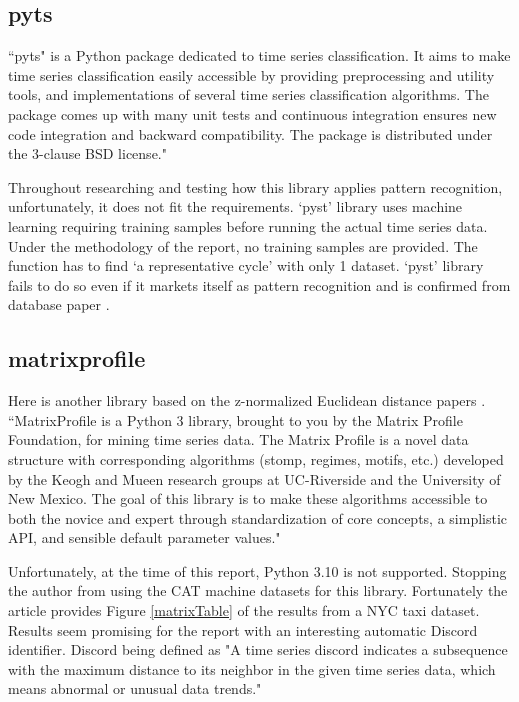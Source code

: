 \subsection{pyts}
``pyts" is a Python package dedicated to time series classification. It aims to make time series classification easily accessible by providing preprocessing and utility tools, and implementations of several time series classification algorithms. The package comes up with many unit tests and continuous integration ensures new code integration and backward compatibility. The package is distributed under the 3-clause BSD license." \cite{JMLR:v21:19-763}

Throughout researching and testing how this library applies pattern recognition, unfortunately, it does not fit the requirements. `pyst' library uses machine learning requiring training samples before running the actual time series data. Under the methodology of the report, no training samples are provided. The function has to find `a representative cycle' with only 1 dataset. `pyst' library fails to do so even if it markets itself as pattern recognition and is confirmed from database paper \cite{DBLP:journals/corr/abs-2104-07406}.

\subsection{matrixprofile}

Here is another library based on the z-normalized Euclidean distance papers \cite{zhu_imamura_nikovski_keogh_2017}. 
``MatrixProfile is a Python 3 library, brought to you by the Matrix Profile Foundation, for mining time series data. The Matrix Profile is a novel data structure with corresponding algorithms (stomp, regimes, motifs, etc.) developed by the Keogh and Mueen research groups at UC-Riverside and the University of New Mexico. The goal of this library is to make these algorithms accessible to both the novice and expert through standardization of core concepts, a simplistic API, and sensible default parameter values." \cite{Van_Benschoten2020} 

Unfortunately, at the time of this report, Python 3.10 is not supported. Stopping the author from using the CAT machine datasets for this library. Fortunately the article \cite{Van_Benschoten2020} provides Figure \ref{matrixTable} of the results from a NYC taxi dataset. Results seem promising for the report with an interesting automatic Discord identifier. Discord being defined as "A time series discord indicates a subsequence with the maximum distance to its neighbor in the given time series data, which means abnormal or unusual data trends."\cite{woodbridge_wilson_rintoul_goldstein_2015}

